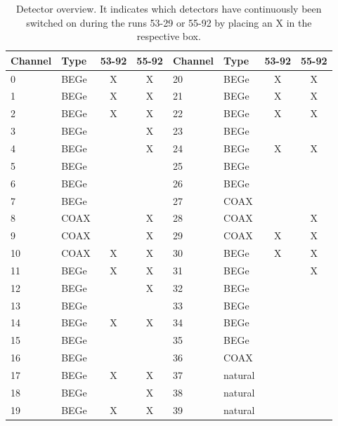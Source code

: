 \begin{table}
    \centering
	\begin{tabular}{|l|l|c|c||l|l|c|c|}
		\hline
		Channel & Type & 53-92 & 55-92 & Channel & Type & 53-92 & 55-92 \\
		\hline
		0 & BEGe & X & X & 20 & BEGe & X & X \\
		\hline
		1 & BEGe & X & X & 21 & BEGe & X & X \\
		\hline
		2 & BEGe & X & X & 22 & BEGe & X & X \\
		\hline
		3 & BEGe &  & X & 23 & BEGe &  &  \\
		\hline
		4 & BEGe &  & X & 24 & BEGe & X & X \\
		\hline
		5 & BEGe &  &  & 25 & BEGe &  &  \\
		\hline
		6 & BEGe &  &  & 26 & BEGe &  &  \\
		\hline
		7 & BEGe &  &  & 27 & COAX &  &  \\
		\hline
		8 & COAX &  & X & 28 & COAX &  & X \\
		\hline
		9 & COAX &  & X & 29 & COAX & X & X \\
		\hline
		10 & COAX & X & X & 30 & BEGe & X & X \\
		\hline
		11 & BEGe & X & X & 31 & BEGe &  & X \\
		\hline
		12 & BEGe &  & X & 32 & BEGe &  &  \\
		\hline
		13 & BEGe &  &  & 33 & BEGe &  &  \\
		\hline
		14 & BEGe & X & X & 34 & BEGe & &  \\
		\hline
		15 & BEGe &  &  & 35 & BEGe &  &  \\
		\hline
		16 & BEGe &  &  & 36 & COAX &  &  \\
		\hline
		17 & BEGe & X & X & 37 & natural &  &  \\
		\hline
		18 & BEGe &  & X & 38 & natural &  &  \\
		\hline
		19 & BEGe & X & X & 39 & natural &  &  \\
		\hline
	\end{tabular}
	\caption{Detector overview. It indicates which detectors have continuously been switched on during the runs 53-29 or 55-92 by placing an X in the respective box.}
	\label{tab:Detector}
\end{table}


